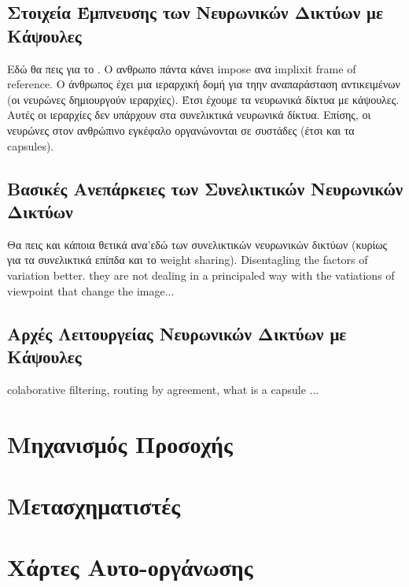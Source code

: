 \subsection{Στοιχεία Έμπνευσης των Νευρωνικών Δικτύων με Κάψουλες}
Εδώ θα πεις για το . Ο ανθρωπο πάντα κάνει impose ανα implixit frame of reference.
Ο άνθρωπος έχει μια ιεραρχική δομή για τηην αναπαράσταση αντικειμένων (οι νευρώνες δημιουργούν ιεραρχίες). Έτσι έχουμε τα νευρωνικά δίκτυα με κάψουλες. Αυτές οι ιεραρχίες δεν υπάρχουν στα συνελικτικά νευρωνικά δίκτυα. Επίσης, οι νευρώνες στον ανθρώπινο εγκέφαλο οργανώνονται σε συστάδες (έτσι και τα capsules).
\subsection{Βασικές Ανεπάρκειες των Συνελικτικών Νευρωνικών Δικτύων}
Θα πεις και κάποια θετικά ανα'εδώ των συνελικτικών νευρωνικών δικτύων (κυρίως για τα συνελικτικά επίπδα και το weight sharing). Disentagling the factors of variation better.
they are not dealing in a principaled way with the vatiations of viewpoint that change the image...
\subsection{Αρχές Λειτουργείας Νευρωνικών Δικτύων με Κάψουλες}
colaborative filtering, routing by agreement, what is a capsule ...
\section{Μηχανισμός Προσοχής}
\section{Μετασχηματιστές}
\section{Χάρτες Αυτο-οργάνωσης}
\label{sec:_SOM}
